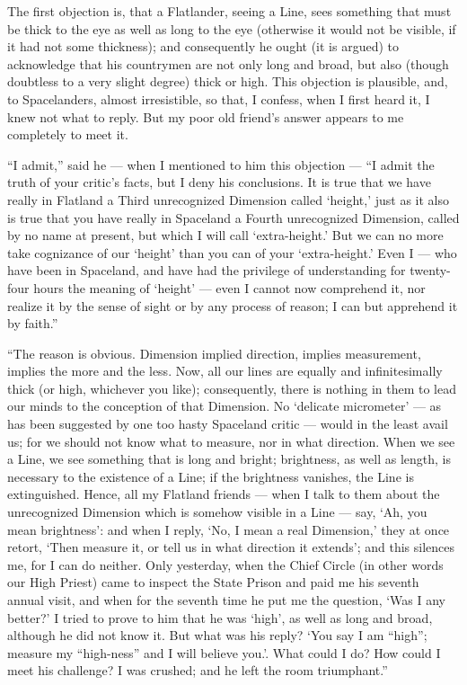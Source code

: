 \documentclass[12pt, a4paper, twoside]{memoir}
\begin{document}
The first objection is, that a Flatlander, seeing a Line, sees something that
must be thick to the eye as well as long to the eye (otherwise it would not be
visible, if it had not some thickness); and consequently he ought (it is
argued) to acknowledge that his countrymen are not only long and broad, but
also (though doubtless to a very slight degree) thick or high. This objection
is plausible, and, to Spacelanders, almost irresistible, so that, I confess,
when I first heard it, I knew not what to reply. But my poor old friend's
answer appears to me completely to meet it.

``I admit,'' said he --- when I mentioned to him this objection --- ``I admit the
truth of your critic's facts, but I deny his conclusions. It is true that we
have really in Flatland a Third unrecognized Dimension called `height,' just
as it also is true that you have really in Spaceland a Fourth unrecognized
Dimension, called by no name at present, but which I will call `extra-height.'
But we can no more take cognizance of our `height' than you can of your
`extra-height.' Even I --- who have been in Spaceland, and have had the
privilege of understanding for twenty-four hours the meaning of `height' ---
even I cannot now comprehend it, nor realize it by the sense of sight or by
any process of reason; I can but apprehend it by faith.''

``The reason is obvious. Dimension implied direction, implies measurement,
implies the more and the less. Now, all our lines are equally and
infinitesimally thick (or high, whichever you like); consequently, there is
nothing in them to lead our minds to the conception of that Dimension. No
`delicate micrometer' --- as has been suggested by one too hasty Spaceland
critic --- would in the least avail us; for we should not know what to measure,
nor in what direction. When we see a Line, we see something that is long and
bright; brightness, as well as length, is necessary to the existence of a
Line; if the brightness vanishes, the Line is extinguished. Hence, all my
Flatland friends --- when I talk to them about the unrecognized Dimension which
is somehow visible in a Line --- say, `Ah, you mean brightness': and when I
reply, `No, I mean a real Dimension,' they at once retort, `Then measure it,
or tell us in what direction it extends'; and this silences me, for I can do
neither. Only yesterday, when the Chief Circle (in other words our High
Priest) came to inspect the State Prison and paid me his seventh annual visit,
and when for the seventh time he put me the question, `Was I any better?' I
tried to prove to him that he was `high', as well as long and broad, although
he did not know it. But what was his reply? `You say I am ``high''; measure my
``high-ness'' and I will believe you.'. What could I do? How could I meet his
challenge? I was crushed; and he left the room triumphant.''
\end{document}
